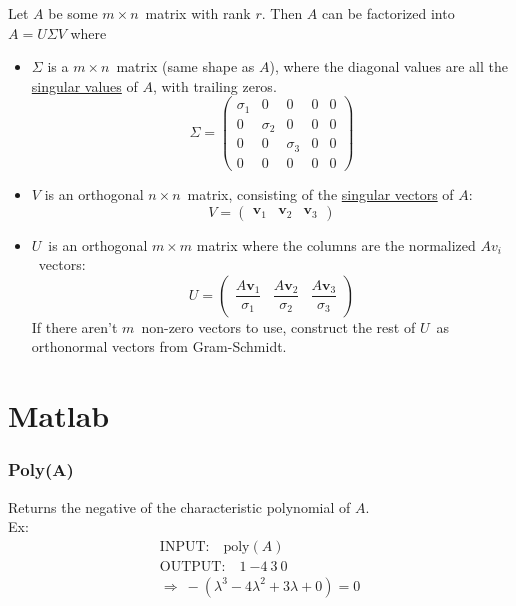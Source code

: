 \documentclass[12p,a4paper]{report}
\renewcommand{\b}{\boldsymbol}
\begin{document}
\begin{tcolorbox}
    Let $A$ be some $m\times n$ matrix with rank $r$. Then $A$ can be factorized into $A = U\Sigma V$ where \\
    \begin{itemize}
        \item $\Sigma$ is a $m\times n$ matrix (same shape as $A$), where the diagonal values are all the \underline{singular values} of $A$, with trailing zeros.
            \[ \Sigma = 
            \begin{pmatrix}
                \sigma_1 & 0 & 0 & 0 & 0 \\
                0 & \sigma_2 & 0 & 0 & 0 \\
                0 & 0 & \sigma_3 & 0 & 0 \\
                0 & 0 & 0 & 0 & 0
            \end{pmatrix}
            \]

        \item $V$ is an orthogonal $n\times n$ matrix, consisting of the \underline{singular vectors} of $A$:
            \[
                V = 
                \begin{pmatrix}
                    \b v_1 & \b v_2 & \b v_3
                \end{pmatrix}
            \]

        \item $U$ is an orthogonal $m\times m$ matrix where the columns are the normalized $A v_i$ vectors:
            \[  U = 
                \begin{pmatrix}
                    \dfrac{A \b v_1}{\sigma_1} & \dfrac{A \b v_2}{\sigma_2} & \dfrac{A \b v_3}{\sigma_3}
                \end{pmatrix}
            \]
            If there aren't $m$ non-zero vectors to use, construct the rest of $U$ as orthonormal vectors from Gram-Schmidt.
    \end{itemize}
\end{tcolorbox}



\chapter{Matlab}
\subsection*{Poly(A)}
Returns the negative of the characteristic polynomial of $A$.\\
Ex:
\begin{align*}
    \text{INPUT:} \quad \text{poly}(A) \\
    \text{OUTPUT:} \quad 1\ {-4}\ 3\ 0 \\
    \Rightarrow \ -(\lambda^3 - 4\lambda^2 + 3\lambda + 0) = 0
\end{align*}
\end{document}
